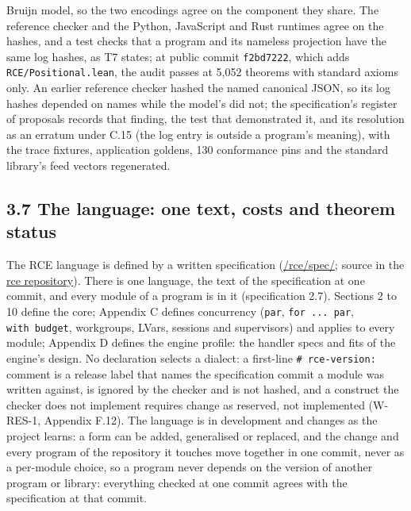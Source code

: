\documentclass[10pt,letterpaper]{article}
\begin{document}
Bruijn model, so the two encodings agree on the component they share.
The reference checker and the Python, JavaScript and Rust runtimes agree
on the hashes, and a test checks that a program and its nameless
projection have the same log hashes, as T7 states; at public commit
\texttt{f2bd7222}, which adds \texttt{RCE/\allowbreak{}Positional.\allowbreak{}lean}, the audit
passes at 5,052 theorems with standard axioms only. An earlier reference
checker hashed the named canonical JSON, so its log hashes depended on
names while the model's did not; the specification's register of
proposals records that finding, the test that demonstrated it, and its
resolution as an erratum under C.15 (the log entry is outside a
program's meaning), with the trace fixtures, application goldens, 130
conformance pins and the standard library's feed vectors regenerated.

\subsection{3.7 The language: one text, costs and theorem
status}\label{the-language-one-text-costs-and-theorem-status}

The RCE language is defined by a written specification
(\href{https://research.openie.dev/rce/spec/}{/rce/spec/}; source in the
\href{https://github.com/openIE-dev/rce}{rce repository}). There is one
language, the text of the specification at one commit, and every module
of a program is in it (specification 2.7). Sections 2 to 10 define the
core; Appendix C defines concurrency (\texttt{par},
\texttt{for\ ...\ par}, \texttt{with\ budget}, workgroups, LVars,
sessions and supervisors) and applies to every module; Appendix D
defines the engine profile: the handler specs and fits of the engine's
design. No declaration selects a dialect: a first-line
\texttt{\#\ rce-\allowbreak{}version:} comment is a release label that names the
specification commit a module was written against, is ignored by the
checker and is not hashed, and a construct the checker does not
implement requires change as reserved, not implemented (W-RES-1,
Appendix F.12). The language is in development and changes as the
project learns: a form can be added, generalised or replaced, and the
change and every program of the repository it touches move together in
one commit, never as a per-module choice, so a program never depends on
the version of another program or library: everything checked at one
commit agrees with the specification at that commit.
\end{document}
